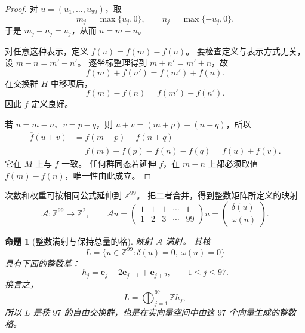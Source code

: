 \documentclass[UTF8,a4paper]{ctexbook}
\newtheorem{proposition}[theorem]{命题}
\theoremstyle{definition}
\numberwithin{equation}{chapter}
\newcommand{\1}{\mathbf{1}}
\begin{document}
\begin{proof}
对 \(u=(u_1,\ldots,u_{99})\)，取
\[
m_j=\max\{u_j,0\},\qquad n_j=\max\{-u_j,0\}.
\]
于是 \(m_j-n_j=u_j\)，从而 \(u=m-n\)。

对任意这种表示，定义
\(\overline f(u)=f(m)-f(n)\)。
要检查定义与表示方式无关，设
\(m-n=m'-n'\)。
逐坐标整理得到 \(m+n'=m'+n\)，故
\[
f(m)+f(n')=f(m')+f(n).
\]
在交换群 \(H\) 中移项后，
\[
f(m)-f(n)=f(m')-f(n').
\]
因此 \(\overline f\) 定义良好。

若 \(u=m-n\)、\(v=p-q\)，则
\(u+v=(m+p)-(n+q)\)，所以
\[
\begin{aligned}
\overline f(u+v)
&=f(m+p)-f(n+q)\\
&=f(m)+f(p)-f(n)-f(q)
=\overline f(u)+\overline f(v).
\end{aligned}
\]
它在 \(M\) 上与 \(f\) 一致。
任何群同态若延伸 \(f\)，在 \(m-n\) 上都必须取值
\(f(m)-f(n)\)，唯一性由此成立。
\end{proof}

次数和权重可按相同公式延伸到 \(\mathbb Z^{99}\)。
把二者合并，得到整数矩阵所定义的映射
\[
\mathcal A:\mathbb Z^{99}\longrightarrow\mathbb Z^2,
\qquad
\mathcal A u=
\begin{pmatrix}
1&1&1&\cdots&1\\
1&2&3&\cdots&99
\end{pmatrix}u
=
\begin{pmatrix}\delta(u)\\ \omega(u)\end{pmatrix}.
\]

\begin{proposition}[整数满射与保持总量的格]\label{aa:integer-kernel}
映射 \(\mathcal A\) 满射。
其核
\[
L=\{u\in\mathbb Z^{99}:\delta(u)=0,\ \omega(u)=0\}
\]
具有下面的整数基：
\[
h_j=\mathbf e_j-2\mathbf e_{j+1}+\mathbf e_{j+2},
\qquad 1\le j\le97.
\]
换言之，
\[
L=\bigoplus_{j=1}^{97}\mathbb Z h_j,
\]
所以 \(L\) 是秩 \(97\) 的自由交换群，也是在实向量空间中由这 \(97\) 个向量生成的整数格。
\end{proposition}
\end{document}
